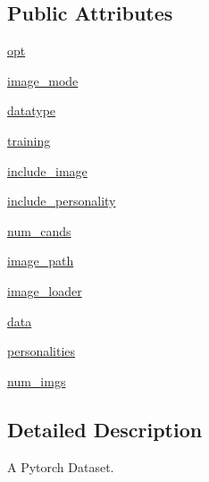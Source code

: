 \subsection*{Public Attributes}
\begin{DoxyCompactItemize}
\item 
\hyperlink{classparlai_1_1tasks_1_1image__chat_1_1agents_1_1DefaultDataset_a14a912c6b7293b439de09f085fd8e34b}{opt}
\item 
\hyperlink{classparlai_1_1tasks_1_1image__chat_1_1agents_1_1DefaultDataset_ae429b8f3c79618de545845c21e098e63}{image\+\_\+mode}
\item 
\hyperlink{classparlai_1_1tasks_1_1image__chat_1_1agents_1_1DefaultDataset_aaa468ef7ff87d1502be666ce690ab030}{datatype}
\item 
\hyperlink{classparlai_1_1tasks_1_1image__chat_1_1agents_1_1DefaultDataset_a2419786bfafc52743cd7a551a5bad7d1}{training}
\item 
\hyperlink{classparlai_1_1tasks_1_1image__chat_1_1agents_1_1DefaultDataset_a3efeafee8792c6e993c00b2efd0e0105}{include\+\_\+image}
\item 
\hyperlink{classparlai_1_1tasks_1_1image__chat_1_1agents_1_1DefaultDataset_a0533c75ec1506750cb33452cdd9ce6ab}{include\+\_\+personality}
\item 
\hyperlink{classparlai_1_1tasks_1_1image__chat_1_1agents_1_1DefaultDataset_ac67c813f8e7d7136f9fdf7f5f5c2f149}{num\+\_\+cands}
\item 
\hyperlink{classparlai_1_1tasks_1_1image__chat_1_1agents_1_1DefaultDataset_aedd4071dfb52d895e871da214dddb025}{image\+\_\+path}
\item 
\hyperlink{classparlai_1_1tasks_1_1image__chat_1_1agents_1_1DefaultDataset_acd123d24d3b3517fb29b0623919be085}{image\+\_\+loader}
\item 
\hyperlink{classparlai_1_1tasks_1_1image__chat_1_1agents_1_1DefaultDataset_a43bdb2cf4b79d988fd5043f85d39af45}{data}
\item 
\hyperlink{classparlai_1_1tasks_1_1image__chat_1_1agents_1_1DefaultDataset_a823a0d9ee64ca85730374c1a944ed789}{personalities}
\item 
\hyperlink{classparlai_1_1tasks_1_1image__chat_1_1agents_1_1DefaultDataset_affc03098db06accb5c4efb0854e6cc42}{num\+\_\+imgs}
\end{DoxyCompactItemize}


\subsection{Detailed Description}
\begin{DoxyVerb}A Pytorch Dataset.
\end{DoxyVerb}
 

